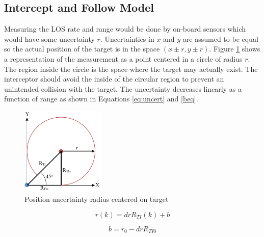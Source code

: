 \documentclass[conference]{IEEEtran}
\begin{document}
%		


\subsection{Intercept and Follow Model}
Measuring the LOS rate and range would be done by on-board sensors which would have some uncertainty $r$. Uncertainties in $x$ and $y$ are assumed to be equal so the actual position of the target is in the space $(x\pm r,y \pm r)$. Figure \ref{fig:uncertrad} shows a representation of the measurement as a point centered in a circle of radius $r$. The region inside the circle is the space where the target may actually exist. The interceptor should avoid the inside of the circular region to prevent an unintended collision with the target. The uncertainty decreases linearly as a function of range as shown in Equations \ref{eq:uncert} and \ref{beq}.

\begin{figure}[H]
	\centering
	\includegraphics[width=4cm]{45deguncert.PNG}
	\caption{Position uncertainty radius centered on target}
	\label{fig:uncertrad}
\end{figure}


\begin{equation} \label{eq:uncert}
r(k) = drR_{TI}(k)+b
\end{equation}

\begin{equation} \label{beq}
b = r_0-drR_{TI0}
\end{equation}
\end{document}
